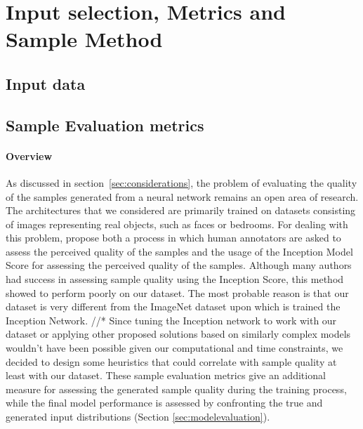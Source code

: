 

\section{Input selection, Metrics and Sample Method}
\label{sec:input_metrics_sample}
\subsection{Input data}
\label{sec:InputSelection}


\subsection{Sample Evaluation metrics}
\label{sec:evaluation}
\paragraph{Overview} As discussed in section~\ref{sec:considerations}, the problem of evaluating the quality of the samples generated from a neural network remains an open area of research. The architectures that we considered are primarily trained on datasets consisting of images representing real objects, such as faces or bedrooms. For dealing with this problem, \citeauthor{improved_gan} propose both a process in which human annotators are asked to assess the perceived quality of the samples \cite[p.~4]{improved_gan} and the usage of the Inception Model \cite{inception} Score for assessing the perceived quality of the samples. Although many authors had success in assessing sample quality using the Inception Score, this method showed to perform poorly on our dataset. The most probable reason is that our dataset is very different from the ImageNet dataset upon which is trained the Inception Network. //* Since tuning the Inception network to work with our dataset or applying other proposed solutions based on similarly complex models wouldn't have been possible given our computational and time constraints, we decided to design some heuristics that could correlate with sample quality at least with our dataset. These sample evaluation metrics give an additional measure for assessing the generated sample quality during the training process, while the final model performance is assessed by confronting the true and generated input distributions (Section \ref{sec:modelevaluation}).

